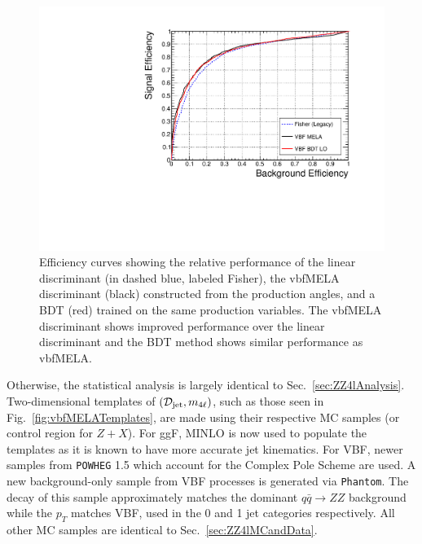 \begin{figure}[htbp]
\begin{center}
\includegraphics[width=.6\linewidth]{HiggsProperties/figures/BDTROC_vbf.pdf}
\caption[Improvement of the $\mathcal{D}_{\rm{jet}}$ Discriminant Using MELA Techniques]{Efficiency curves showing the relative performance of the linear discriminant (in dashed blue, labeled Fisher), the vbfMELA discriminant (black) constructed from the production angles, and a BDT (red) trained on the same production variables. The vbfMELA discriminant shows improved performance over the linear discriminant and the BDT method shows similar performance as vbfMELA.}
\label{fig:vbfMELAROC}
\end{center}
\end{figure}

Otherwise, the statistical analysis is largely identical to Sec.~\ref{sec:ZZ4lAnalysis}. Two-dimensional templates of $(\mathcal{D}_{\rm{jet}},m_{4\ell})$, such as those seen in Fig.~\ref{fig:vbfMELATemplates}, are made using their respective MC samples (or control region for $Z+X$). For ggF, MINLO is now used to populate the templates as it is known to have more accurate jet kinematics. For VBF, newer samples from {\tt POWHEG} 1.5 which account for the Complex Pole Scheme are used. A new background-only sample from VBF processes is generated via {\tt Phantom}. The decay of this sample approximately matches the dominant $q\bar{q}\rightarrow ZZ$ background while the $p_{T}$ matches VBF, used in the 0 and 1 jet categories respectively. All other MC samples are identical to Sec.~\ref{sec:ZZ4lMCandData}.

